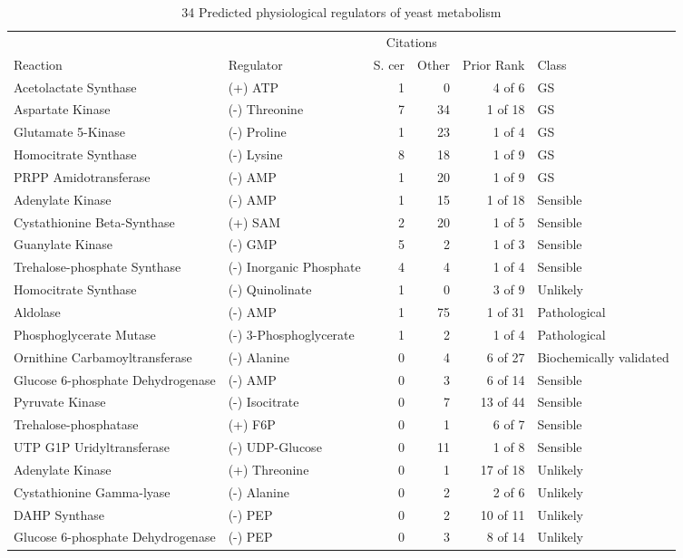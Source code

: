 \footnotesize
\begin{singlespace}
\begin{sidewaystable}
\centering
\caption[34 Predicted physiological regulators of yeast metabolism]{34 Predicted physiological regulators of yeast metabolism}
\label{signif_regulators}
\begin{tabular}{|l l || r r| r l|}\hline
&&\multicolumn{2}{c|}{Citations}&&\\
Reaction&Regulator&S. cer&Other&Prior Rank&Class\\\Xhline{2\arrayrulewidth} 
Acetolactate Synthase&(+) ATP&1&0&4 of 6&GS\\
Aspartate Kinase&(-) Threonine&7&34&1 of 18&GS\\
Glutamate 5-Kinase&(-) Proline&1&23&1 of 4&GS\\
Homocitrate Synthase&(-) Lysine&8&18&1 of 9&GS\\
PRPP Amidotransferase&(-) AMP&1&20&1 of 9&GS\\
Adenylate Kinase&(-) AMP&1&15&1 of 18&Sensible\\
Cystathionine Beta-Synthase&(+) SAM&2&20&1 of 5&Sensible\\
Guanylate Kinase&(-) GMP&5&2&1 of 3&Sensible\\
Trehalose-phosphate Synthase&(-) Inorganic Phosphate&4&4&1 of 4&Sensible\\
Homocitrate Synthase&(-) Quinolinate&1&0&3 of 9&Unlikely\\
Aldolase&(-) AMP&1&75&1 of 31&Pathological\\
Phosphoglycerate Mutase&(-) 3-Phosphoglycerate&1&2&1 of 4&Pathological\\\hline
Ornithine Carbamoyltransferase&(-) Alanine&0&4&6 of 27&Biochemically validated\\
Glucose 6-phosphate Dehydrogenase&(-) AMP&0&3&6 of 14&Sensible\\
Pyruvate Kinase&(-) Isocitrate&0&7&13 of 44&Sensible\\
Trehalose-phosphatase&(+) F6P&0&1&6 of 7&Sensible\\
UTP G1P Uridyltransferase&(-) UDP-Glucose&0&11&1 of 8&Sensible\\
Adenylate Kinase&(+) Threonine&0&1&17 of 18&Unlikely\\
Cystathionine Gamma-lyase&(-) Alanine&0&2&2 of 6&Unlikely\\
DAHP Synthase&(-) PEP&0&2&10 of 11&Unlikely\\
Glucose 6-phosphate Dehydrogenase&(-) PEP&0&3&8 of 14&Unlikely\\

\end{tabular}
\end{sidewaystable}
\end{singlespace}
